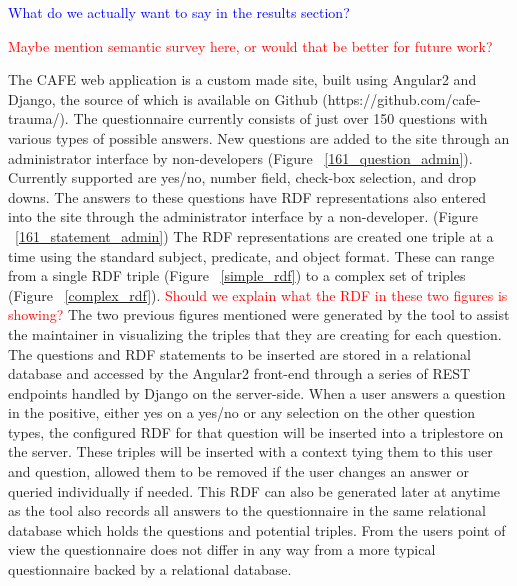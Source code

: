 \documentclass{amia}
\begin{document}
\textcolor{blue}{What do we actually want to say in the results section?}

\textcolor{red}{Maybe mention semantic survey here, or would that be better for future work?}

The CAFE web application is a custom made site, built using Angular2 and Django, the source of which is available on Github (https://github.com/cafe-trauma/).
The questionnaire currently consists of just over 150 questions with various types of possible answers.
New questions are added to the site through an administrator interface by non-developers (Figure ~\ref{161_question_admin}).
Currently supported are yes/no, number field, check-box selection, and drop downs.
The answers to these questions have RDF representations also entered into the site through the administrator interface by a non-developer. (Figure ~\ref{161_statement_admin})
The RDF representations are created one triple at a time using the standard subject, predicate, and object format.
These can range from a single RDF triple (Figure ~\ref{simple_rdf}) to a complex set of triples (Figure ~\ref{complex_rdf}).
\textcolor{red}{Should we explain what the RDF in these two figures is showing?}
The two previous figures mentioned were generated by the tool to assist the maintainer in visualizing the triples that they are creating for each question.
The questions and RDF statements to be inserted are stored in a relational database and accessed by the Angular2 front-end through a series of REST endpoints handled by Django on the server-side.
When a user answers a question in the positive, either yes on a yes/no or any selection on the other question types, the configured RDF for that question will be inserted into a triplestore on the server.
These triples will be inserted with a context tying them to this user and question, allowed them to be removed if the user changes an answer or queried individually if needed.
This RDF can also be generated later at anytime as the tool also records all answers to the questionnaire in the same relational database which holds the questions and potential triples.
From the users point of view the questionnaire does not differ in any way from a more typical questionnaire backed by a relational database.
\end{document}
